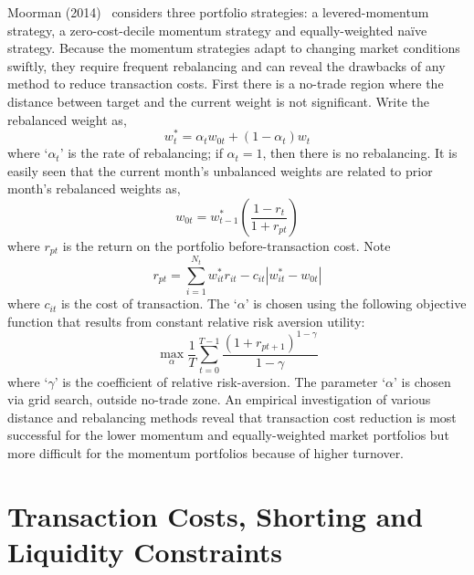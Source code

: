 Moorman (2014)~\cite{moorman} considers three portfolio strategies: a levered-momentum strategy, a zero-cost-decile momentum strategy and equally-weighted na\"ive strategy. Because the momentum strategies adapt to changing market conditions swiftly, they require frequent rebalancing and can reveal the drawbacks of any method to reduce transaction costs. First there is a no-trade region where the distance between target and the current weight is not significant. Write the rebalanced weight as,
	\begin{equation}\label{eqn:rebalanceweight}
	w_t^*= \alpha_t w_{0t} + (1-\alpha_t)w_t
	\end{equation}
where `$\alpha_t$' is the rate of rebalancing; if $\alpha_t=1$, then there is no rebalancing. It is easily seen that the current month's unbalanced weights are related to prior month's rebalanced weights as,
	\begin{equation}\label{eqn:priorrebalanced}
	w_{0t}= w_{t-1}^* \left(\dfrac{1-r_t}{1+r_{pt}}\right)
	\end{equation}
where $r_{pt}$ is the return on the portfolio before-transaction cost. Note
	\begin{equation}\label{eqn:transnote}
	r_{pt}= \sum_{i=1}^{N_t} w_{it}^* r_{it} - c_{it} |w_{it}^* - w_{0t}|
	\end{equation}
where $c_{it}$ is the cost of transaction. The `$\alpha$' is chosen using the following objective function that results from constant relative risk aversion utility:
	\begin{equation}\label{eqn:objectivefun}
	\max_\alpha \dfrac{1}{T} \sum_{t=0}^{T-1} \dfrac{(1+r_{pt+1})^{1-\gamma}}{1-\gamma}
	\end{equation}
where `$\gamma$' is the coefficient of relative risk-aversion. The parameter `$\alpha$' is chosen via grid search, outside no-trade zone. An empirical investigation of various distance and rebalancing methods reveal that transaction cost reduction is most successful for the lower momentum and equally-weighted market portfolios but more difficult for the momentum portfolios because of higher turnover. 



\section{Transaction Costs, Shorting and Liquidity Constraints}



